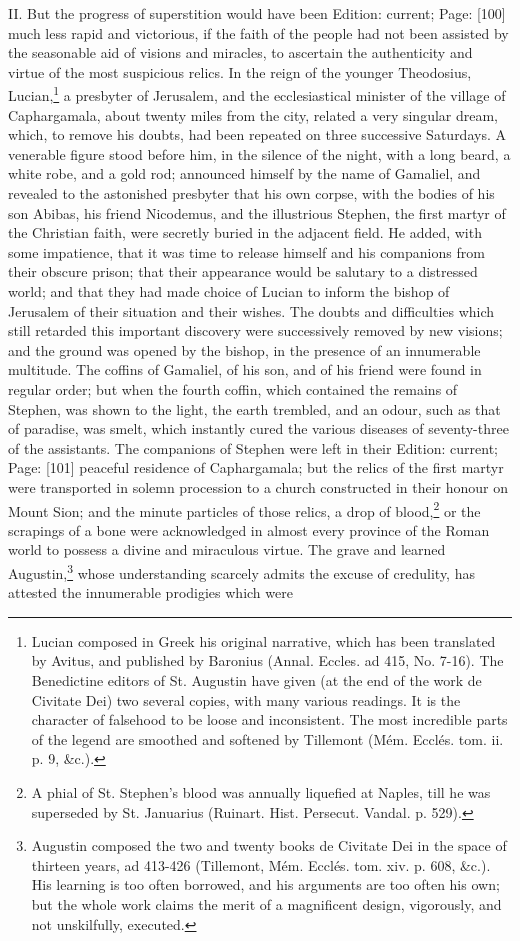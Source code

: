 II. But the progress of superstition would have been Edition: current; Page: [100] much less rapid and victorious, if the faith of the people had not been assisted by the seasonable aid of visions and miracles, to ascertain the authenticity and virtue of the most suspicious relics. In the reign of the younger Theodosius, Lucian,\footnote{Lucian composed in Greek his original narrative, which has been translated by Avitus, and published by Baronius (Annal. Eccles. ad 415, No. 7-16). The Benedictine editors of St. Augustin have given (at the end of the work de Civitate Dei) two several copies, with many various readings. It is the character of falsehood to be loose and inconsistent. The most incredible parts of the legend are smoothed and softened by Tillemont (Mém. Ecclés. tom. ii. p. 9, \&c.).} a presbyter of Jerusalem, and the ecclesiastical minister of the village of Caphargamala, about twenty miles from the city, related a very singular dream, which, to remove his doubts, had been repeated on three successive Saturdays. A venerable figure stood before him, in the silence of the night, with a long beard, a white robe, and a gold rod; announced himself by the name of Gamaliel, and revealed to the astonished presbyter that his own corpse, with the bodies of his son Abibas, his friend Nicodemus, and the illustrious Stephen, the first martyr of the Christian faith, were secretly buried in the adjacent field. He added, with some impatience, that it was time to release himself and his companions from their obscure prison; that their appearance would be salutary to a distressed world; and that they had made choice of Lucian to inform the bishop of Jerusalem of their situation and their wishes. The doubts and difficulties which still retarded this important discovery were successively removed by new visions; and the ground was opened by the bishop, in the presence of an innumerable multitude. The coffins of Gamaliel, of his son, and of his friend were found in regular order; but when the fourth coffin, which contained the remains of Stephen, was shown to the light, the earth trembled, and an odour, such as that of paradise, was smelt, which instantly cured the various diseases of seventy-three of the assistants. The companions of Stephen were left in their Edition: current; Page: [101] peaceful residence of Caphargamala; but the relics of the first martyr were transported in solemn procession to a church constructed in their honour on Mount Sion; and the minute particles of those relics, a drop of blood,\footnote{A phial of St. Stephen\texthebrew{}’s blood was annually liquefied at Naples, till he was superseded by St. Januarius (Ruinart. Hist. Persecut. Vandal. p. 529).} or the scrapings of a bone were acknowledged in almost every province of the Roman world to possess a divine and miraculous virtue. The grave and learned Augustin,\footnote{Augustin composed the two and twenty books de Civitate Dei in the space of thirteen years, ad 413-426 (Tillemont, Mém. Ecclés. tom. xiv. p. 608, \&c.). His learning is too often borrowed, and his arguments are too often his own; but the whole work claims the merit of a magnificent design, vigorously, and not unskilfully, executed.} whose understanding scarcely admits the excuse of credulity, has attested the innumerable prodigies which were 